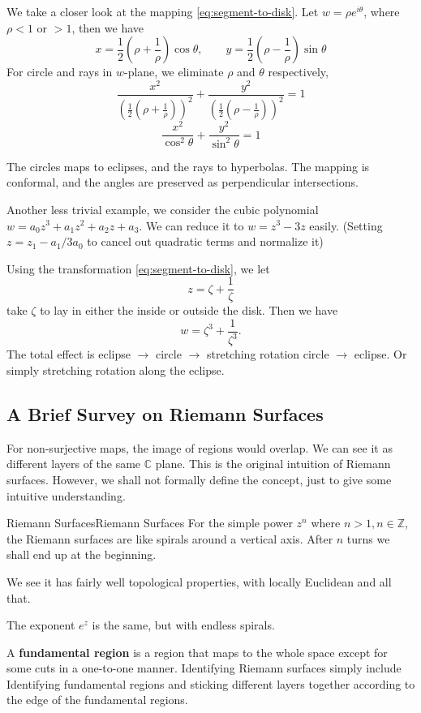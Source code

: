 \documentclass[../main.tex]{subfiles}
\begin{document}
We take a closer look at the mapping \ref{eq:segment-to-disk}. Let $w = \rho e^{i \theta}$, where $\rho<1$ or $>1$, then we have
\begin{equation*}
	x = \frac{1}{2} \left(\rho + \frac{1}{\rho}\right) \cos \theta, \qquad
	y = \frac{1}{2} \left(\rho - \frac{1}{\rho}\right) \sin \theta
\end{equation*}
For circle and rays in $w$-plane, we eliminate $\rho$ and $\theta$ respectively,
\begin{equation*}
	\frac{x^2}{\left(\frac{1}{2}(\rho + \frac{1}{\rho})\right)^2} + \frac{y^2}{\left(\frac{1}{2}(\rho - \frac{1}{\rho})\right)^2} = 1
\end{equation*}
\begin{equation*}
	\frac{x^2}{\cos ^2 \theta} + \frac{y^2}{\sin ^2 \theta} = 1
\end{equation*}

The circles maps to eclipses, and the rays to hyperbolas. The mapping is conformal, and the angles are preserved as perpendicular intersections.

Another less trivial example, we consider the cubic polynomial $w = a_0z^3+a_1z^2+a_2z+a_3$. We can reduce it to $w = z^3-3z$ easily. (Setting $z=z_1-a_1 / 3a_0$ to cancel out quadratic terms and normalize it)

Using the transformation \ref{eq:segment-to-disk}, we let
\begin{equation*}
z = \zeta + \frac{1}{\zeta}
\end{equation*}
take $\zeta$ to lay in either the inside or outside the disk. Then we have
\begin{equation*}
w = \zeta^3+\frac{1}{\zeta^3}.
\end{equation*}
The total effect is eclipse $\rightarrow $ circle $\rightarrow $ stretching rotation circle $\rightarrow $ eclipse. Or simply stretching rotation along the eclipse.

\subsection{A Brief Survey on Riemann Surfaces}
For non-surjective maps, the image of regions would overlap. We can see it as different layers of the same $\mathbb{C}$ plane. This is the original intuition of Riemann surfaces. However, we shall not formally define the concept, just to give some intuitive understanding.

\begin{example}{Riemann Surfaces}{Riemann Surfaces}
For the simple power $z^n$ where $n>1,n\in \mathbb{Z}$, the Riemann surfaces are like spirals around a vertical axis. After $n$ turns we shall end up at the beginning.

We see it has fairly well topological properties, with locally Euclidean and all that.

The exponent $e^z$ is the same, but with endless spirals.
\end{example}

A \textbf{fundamental region} is a region that maps to the whole space except for some cuts in a one-to-one manner. Identifying Riemann surfaces simply include Identifying fundamental regions and sticking different layers together according to the edge of the fundamental regions.
\end{document}
